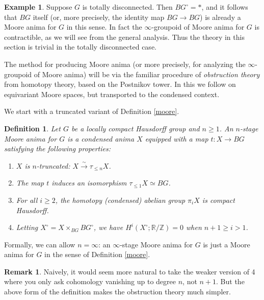 \documentclass[12pt]{article}
\newtheorem{definition}[theorem]{Definition}
\theoremstyle{definition}
\newtheorem{example}[theorem]{Example}
\newtheorem{remark}[theorem]{Remark}
\newcommand{\mbb}{\mathbb}
\begin{document}
\begin{example}
Suppose $G$ is totally disconnected.  Then $BG^\circ=\ast$, and it follows that $BG$ itself (or, more precisely, the identity  map $BG \to BG$) is already a Moore anima for $G$ in this sense.  In fact the $\infty$-groupoid of Moore anima for $G$ is contractible, as we will see from the general analysis.  Thus the theory in this section is trivial in the totally disconnected case.
\end{example}


The method for producing Moore anima (or more precisely, for analyzing the $\infty$-groupoid of Moore anima) will be via the familiar procedure of \emph{obstruction theory} from homotopy theory, based on the Postnikov tower.  In this we follow \cite{smith} on equivariant Moore spaces, but transported to the condensed context.

We start with a truncated variant of Definition \ref{moore}.

\begin{definition}\label{tmoore}
Let $G$ be a locally compact Hausdorff group and $n\geq 1$.  An \emph{$n$-stage Moore anima} for $G$ is a condensed anima $X$ equipped with a map $t: X \to BG$ satisfying the following properties:
\begin{enumerate}
\item $X$ is $n$-truncated: $X\overset{\sim}{\rightarrow} \tau_{\leq n}X$.
\item The map $t$ induces an isomorphism $\tau_{\leq 1}X \simeq BG$.
\item For all $i\geq 2$, the homotopy (condensed) abelian group $\pi_i X$ is compact Hausdorff.
\item Letting $X^\circ = X\times_{BG}BG^\circ$, we have $H^i(X^\circ;\mbb{R}/\mbb{Z})=0$ when $n+1\geq i>1$.
\end{enumerate}
\end{definition}

Formally, we can allow $n=\infty$: an $\infty$-stage Moore anima for $G$ is just a Moore anima for $G$ in the sense of Definition \ref{moore}.

\begin{remark}
Naively, it would seem more natural to take the weaker version of 4 where you only ask cohomology vanishing up to degree $n$, not $n+1$.  But the above form of the definition makes the obstruction theory much simpler.
\end{remark}
\end{document}
